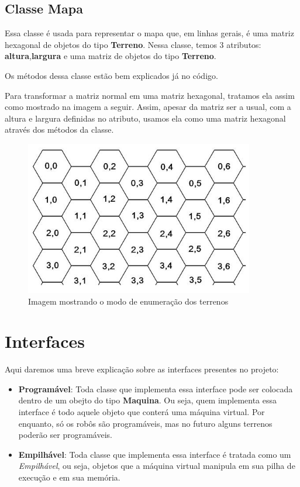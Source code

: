 \documentclass[11pt]{article}
\begin{document}
\subsection{Classe Mapa}

Essa classe é usada para representar o mapa que, em linhas gerais, é uma matriz hexagonal de objetos do tipo \textbf{\color{red}Terreno}. Nessa classe, temos 3 atributos: \textbf{\color{red}altura},\textbf{\color{red}largura} e uma matriz de objetos do tipo \textbf{\color{red}Terreno}.

Os métodos dessa classe estão bem explicados já no código.

Para transformar a matriz normal em uma matriz hexagonal, tratamos ela assim como mostrado na imagem a seguir. Assim, apesar da matriz ser a usual, com a altura e largura definidas no atributo, usamos ela como uma matriz hexagonal através dos métodos da classe.

\begin{figure}[h]

    \center

    \includegraphics[width=10cm]{hex_array.jpg}

    \label{hexmatrix}

    \caption{Imagem mostrando o modo de enumeração dos terrenos}

\end{figure}


\section{Interfaces}

Aqui daremos uma breve explicação sobre as interfaces presentes no projeto:

\begin{itemize}

	\item \textbf{Programável}: Toda classe que implementa essa interface pode ser colocada dentro
	de um obejto do tipo \textbf{\color{red}Maquina}. Ou seja, quem implementa essa interface é
	todo aquele objeto que conterá uma máquina virtual. Por enquanto, só os robôs são programáveis,
	mas no futuro alguns terrenos poderão ser programáveis.

	\item \textbf{Empilhável}: Toda classe que implementa essa interface é tratada como um \emph{Empilhável},
	ou seja, objetos que a máquina virtual manipula em sua pilha de execução e em sua memória.

\end{itemize}
\end{document}

